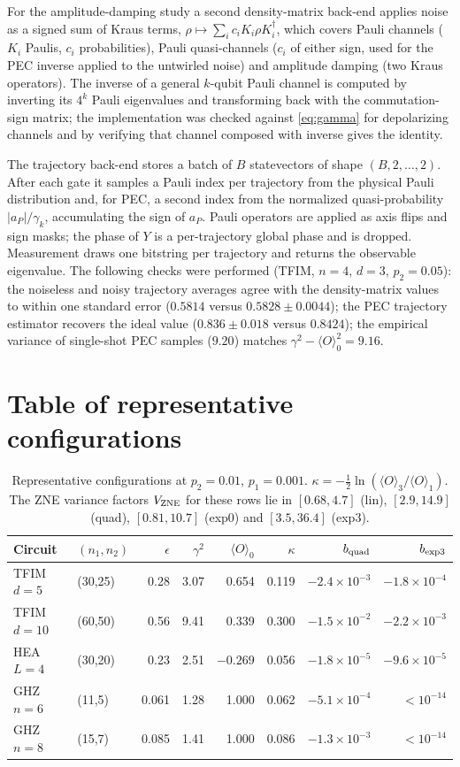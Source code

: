 \documentclass[11pt,a4paper]{article}
\theoremstyle{remark}
\newcommand{\eps}{\epsilon}
\begin{document}
For the amplitude-damping study a second density-matrix back-end applies noise as a signed sum of Kraus terms, $\rho\mapsto\sum_i c_iK_i\rho K_i^\dagger$, which covers Pauli channels ($K_i$ Paulis, $c_i$ probabilities), Pauli quasi-channels ($c_i$ of either sign, used for the PEC inverse applied to the untwirled noise) and amplitude damping (two Kraus operators). The inverse of a general $k$-qubit Pauli channel is computed by inverting its $4^k$ Pauli eigenvalues and transforming back with the commutation-sign matrix; the implementation was checked against \cref{eq:gamma} for depolarizing channels and by verifying that channel composed with inverse gives the identity.

The trajectory back-end stores a batch of $B$ statevectors of shape $(B,2,\ldots,2)$. After each gate it samples a Pauli index per trajectory from the physical Pauli distribution and, for PEC, a second index from the normalized quasi-probability $|a_P|/\gamma_k$, accumulating the sign of $a_P$. Pauli operators are applied as axis flips and sign masks; the phase of $Y$ is a per-trajectory global phase and is dropped. Measurement draws one bitstring per trajectory and returns the observable eigenvalue. The following checks were performed (TFIM, $n=4$, $d=3$, $p_2=0.05$): the noiseless and noisy trajectory averages agree with the density-matrix values to within one standard error ($0.5814$ versus $0.5828\pm0.0044$); the PEC trajectory estimator recovers the ideal value ($0.836\pm0.018$ versus $0.8424$); the empirical variance of single-shot PEC samples ($9.20$) matches $\gamma^2-\langle O\rangle_0^2=9.16$.

\section{Table of representative configurations}
\begin{table}[h]
\centering\small
\begin{tabular}{llrrrrrr}
\toprule
Circuit & $(n_1,n_2)$ & $\eps$ & $\gamma^2$ & $\langle O\rangle_0$ & $\kappa$ & $b_{\rm quad}$ & $b_{\rm exp3}$\\
\midrule
TFIM $d=5$ & (30,25) & 0.28 & 3.07 & 0.654 & 0.119 & $-2.4\times10^{-3}$ & $-1.8\times10^{-4}$\\
TFIM $d=10$ & (60,50) & 0.56 & 9.41 & 0.339 & 0.300 & $-1.5\times10^{-2}$ & $-2.2\times10^{-3}$\\
HEA $L=4$ & (30,20) & 0.23 & 2.51 & $-0.269$ & 0.056 & $-1.8\times10^{-5}$ & $-9.6\times10^{-5}$\\
GHZ $n=6$ & (11,5) & 0.061 & 1.28 & 1.000 & 0.062 & $-5.1\times10^{-4}$ & $<10^{-14}$\\
GHZ $n=8$ & (15,7) & 0.085 & 1.41 & 1.000 & 0.086 & $-1.3\times10^{-3}$ & $<10^{-14}$\\
\bottomrule
\end{tabular}
\caption{Representative configurations at $p_2=0.01$, $p_1=0.001$. $\kappa=-\frac12\ln(\langle O\rangle_3/\langle O\rangle_1)$. The ZNE variance factors $V_{\rm ZNE}$ for these rows lie in $[0.68,4.7]$ (lin), $[2.9,14.9]$ (quad), $[0.81,10.7]$ (exp0) and $[3.5,36.4]$ (exp3).}
\end{table}



\end{document}
